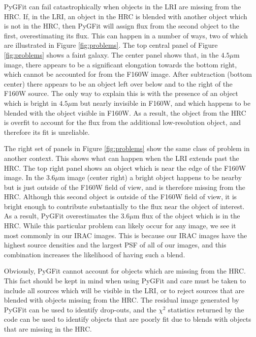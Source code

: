 \documentclass[preprint]{aastex}
\newcommand{\pygfit}{PyGFit}
\begin{document}
\pygfit{} can fail catastrophically when objects in the LRI are missing from the HRC.  If, in the LRI, an object in the HRC is blended with another object which is not in the HRC, then \pygfit{} will assign flux from the second object to the first, overestimating its flux.  This can happen in a number of ways, two of which are illustrated in Figure \ref{fig:problems}.  The top central panel of Figure \ref{fig:problems} shows a faint galaxy.  The center panel shows that, in the $4.5\mu$m image, there appears to be a significant elongation towards the bottom right, which cannot be accounted for from the F160W image.  After subtraction (bottom center) there appears to be an object left over below and to the right of the F160W source.  The only way to explain this is with the presence of an object which is bright in $4.5\mu$m but nearly invisible in F160W, and which happens to be blended with the object visible in F160W.  As a result, the object from the HRC is overfit to account for the flux from the additional low-resolution object, and therefore its fit is unreliable.

The right set of panels in Figure \ref{fig:problems} show the same class of problem in another context.  This shows what can happen when the LRI extends past the HRC.  The top right panel shows an object which is near the edge of the F160W image.  In the $3.6\mu$m image (center right) a bright object happens to be nearby but is just outside of the F160W field of view, and is therefore missing from the HRC.  Although this second object is outside of the F160W field of view, it is bright enough to contribute substantially to the flux near the object of interest.  As a result, \pygfit{} overestimates the $3.6\mu$m flux of the object which is in the HRC.  While this particular problem can likely occur for any image, we see it most commonly in our IRAC images.  This is because our IRAC images have the highest source densities and the largest PSF of all of our images, and this combination increases the likelihood of having such a blend.

Obviously, \pygfit{} cannot account for objects which are missing from the HRC.  This fact should be kept in mind when using \pygfit{} and care must be taken to include all sources which will be visible in the LRI, or to reject sources that are blended with objects missing from the HRC. The residual image generated by \pygfit{} can be used to identify drop-outs, and the $\chi^2$ statistics returned by the code can be used to identify objects that are poorly fit due to blends with objects that are missing in the HRC.
\end{document}

